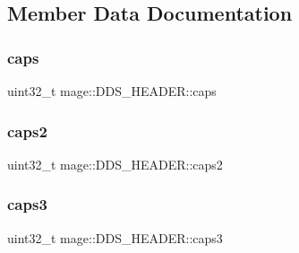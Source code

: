 \subsection{Member Data Documentation}
\hypertarget{structmage_1_1_d_d_s___h_e_a_d_e_r_ad44c3f88942707c377f25a64fb1b6872}{}\label{structmage_1_1_d_d_s___h_e_a_d_e_r_ad44c3f88942707c377f25a64fb1b6872} 
\subsubsection{\texorpdfstring{caps}{caps}}
{\footnotesize\ttfamily uint32\+\_\+t mage\+::\+D\+D\+S\+\_\+\+H\+E\+A\+D\+E\+R\+::caps}

\hypertarget{structmage_1_1_d_d_s___h_e_a_d_e_r_ada2de9e6468e8d5da2a3e246bc079dc9}{}\label{structmage_1_1_d_d_s___h_e_a_d_e_r_ada2de9e6468e8d5da2a3e246bc079dc9} 
\subsubsection{\texorpdfstring{caps2}{caps2}}
{\footnotesize\ttfamily uint32\+\_\+t mage\+::\+D\+D\+S\+\_\+\+H\+E\+A\+D\+E\+R\+::caps2}

\hypertarget{structmage_1_1_d_d_s___h_e_a_d_e_r_a85726c8826cc856565e2c978cb37ff4b}{}\label{structmage_1_1_d_d_s___h_e_a_d_e_r_a85726c8826cc856565e2c978cb37ff4b} 
\subsubsection{\texorpdfstring{caps3}{caps3}}
{\footnotesize\ttfamily uint32\+\_\+t mage\+::\+D\+D\+S\+\_\+\+H\+E\+A\+D\+E\+R\+::caps3}

\hypertarget{structmage_1_1_d_d_s___h_e_a_d_e_r_a9f36aa53c86e3aa2bd7c667f28460645}{}\label{structmage_1_1_d_d_s___h_e_a_d_e_r_a9f36aa53c86e3aa2bd7c667f28460645} 
